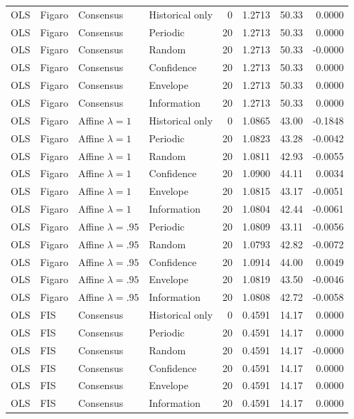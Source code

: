 \begin{longtable}{llllrrrr}
OLS & Figaro & Consensus & Historical only & 0 & 1.2713 & 50.33 & 0.0000 \\
OLS & Figaro & Consensus & Periodic & 20 & 1.2713 & 50.33 & 0.0000 \\
OLS & Figaro & Consensus & Random & 20 & 1.2713 & 50.33 & -0.0000 \\
OLS & Figaro & Consensus & Confidence & 20 & 1.2713 & 50.33 & 0.0000 \\
OLS & Figaro & Consensus & Envelope & 20 & 1.2713 & 50.33 & 0.0000 \\
OLS & Figaro & Consensus & Information & 20 & 1.2713 & 50.33 & 0.0000 \\
OLS & Figaro & Affine $\lambda=1$ & Historical only & 0 & 1.0865 & 43.00 & -0.1848 \\
OLS & Figaro & Affine $\lambda=1$ & Periodic & 20 & 1.0823 & 43.28 & -0.0042 \\
OLS & Figaro & Affine $\lambda=1$ & Random & 20 & 1.0811 & 42.93 & -0.0055 \\
OLS & Figaro & Affine $\lambda=1$ & Confidence & 20 & 1.0900 & 44.11 & 0.0034 \\
OLS & Figaro & Affine $\lambda=1$ & Envelope & 20 & 1.0815 & 43.17 & -0.0051 \\
OLS & Figaro & Affine $\lambda=1$ & Information & 20 & 1.0804 & 42.44 & -0.0061 \\
OLS & Figaro & Affine $\lambda=.95$ & Periodic & 20 & 1.0809 & 43.11 & -0.0056 \\
OLS & Figaro & Affine $\lambda=.95$ & Random & 20 & 1.0793 & 42.82 & -0.0072 \\
OLS & Figaro & Affine $\lambda=.95$ & Confidence & 20 & 1.0914 & 44.00 & 0.0049 \\
OLS & Figaro & Affine $\lambda=.95$ & Envelope & 20 & 1.0819 & 43.50 & -0.0046 \\
OLS & Figaro & Affine $\lambda=.95$ & Information & 20 & 1.0808 & 42.72 & -0.0058 \\
OLS & FIS & Consensus & Historical only & 0 & 0.4591 & 14.17 & 0.0000 \\
OLS & FIS & Consensus & Periodic & 20 & 0.4591 & 14.17 & 0.0000 \\
OLS & FIS & Consensus & Random & 20 & 0.4591 & 14.17 & -0.0000 \\
OLS & FIS & Consensus & Confidence & 20 & 0.4591 & 14.17 & 0.0000 \\
OLS & FIS & Consensus & Envelope & 20 & 0.4591 & 14.17 & 0.0000 \\
OLS & FIS & Consensus & Information & 20 & 0.4591 & 14.17 & 0.0000 \\

\end{longtable}
